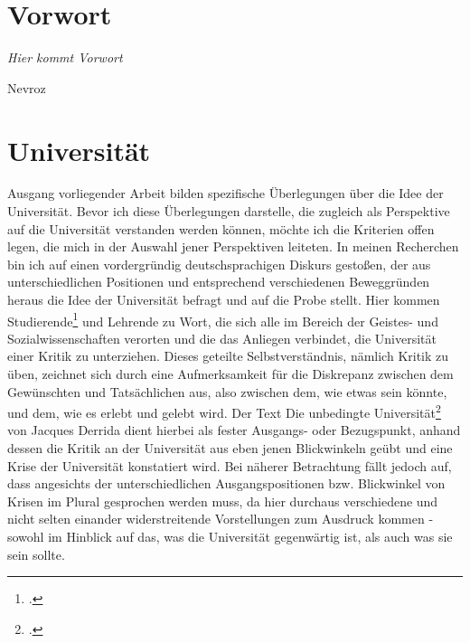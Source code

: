 \section{Vorwort}

\setlength{\epigraphwidth}{0.7\textwidth}

\epigraph{\textit{Hier kommt Vorwort}}{Nevroz \footnotemark}

\section{Universität}

Ausgang vorliegender Arbeit bilden spezifische Überlegungen über die Idee der
Universität. Bevor ich diese Überlegungen darstelle, die zugleich als
Perspektive auf die Universität verstanden werden können, möchte ich die
Kriterien offen legen, die mich in der Auswahl jener Perspektiven leiteten. In
meinen Recherchen bin ich auf einen vordergründig deutschsprachigen Diskurs
gestoßen, der aus unterschiedlichen Positionen und entsprechend verschiedenen
Beweggründen heraus die Idee der Universität befragt und auf die Probe stellt.
Hier kommen Studierende\footnotemark \footcitetext{lohman} und Lehrende\footnotemark {} zu Wort, die sich alle im Bereich der Geistes- und
  Sozialwissenschaften verorten und die das Anliegen verbindet, die Universität
  einer Kritik zu unterziehen. Dieses geteilte Selbstverständnis, nämlich
  Kritik zu üben, zeichnet sich durch eine Aufmerksamkeit für die Diskrepanz
  zwischen dem Gewünschten und Tatsächlichen aus, also zwischen dem, wie etwas
  sein könnte, und dem, wie es erlebt und gelebt wird.\footnotemark
   Der Text \glqq Die
  unbedingte Universität\grqq\footnotemark \footcitetext{derrida} von Jacques Derrida dient hierbei als fester
  Ausgangs- oder Bezugspunkt, anhand dessen die Kritik an der Universität aus
  eben jenen Blickwinkeln geübt und eine Krise der Universität konstatiert
  wird.  Bei näherer Betrachtung fällt jedoch auf, dass angesichts der
  unterschiedlichen Ausgangspositionen bzw. Blickwinkel von Krisen im Plural
  gesprochen werden muss, da hier durchaus verschiedene und nicht selten
  einander widerstreitende Vorstellungen zum Ausdruck kommen - sowohl im
  Hinblick auf das, was die Universität gegenwärtig ist, als auch was sie sein
  sollte. 

